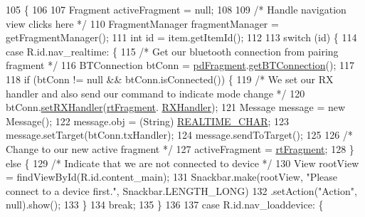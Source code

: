 \begin{DoxyCode}
105                                                            \{
106 
107         Fragment activeFragment = null;
108 
109         \textcolor{comment}{/* Handle navigation view clicks here */}
110         FragmentManager fragmentManager = getFragmentManager();
111         \textcolor{keywordtype}{int} \textcolor{keywordtype}{id} = item.getItemId();
112 
113         \textcolor{keywordflow}{switch} (\textcolor{keywordtype}{id}) \{
114             \textcolor{keywordflow}{case} R.id.nav\_realtime: \{
115                 \textcolor{comment}{/* Get our bluetooth connection from pairing fragment */}
116                 BTConnection btConn = \hyperlink{class_android_app_1_1_main_activity_a6dea684256a0cd0f73f87546ec2b0de2}{pdFragment}.\hyperlink{class_android_app_1_1_pair_device_fragment_ae68bfed66a421a3020a257cbc034e42d}{getBTConnection}();
117 
118                 \textcolor{keywordflow}{if} (btConn != null && btConn.isConnected()) \{
119                     \textcolor{comment}{/* We set our RX handler and also send our command to indicate mode change */}
120                     btConn.\hyperlink{class_android_app_1_1_b_t_connection_a41022747db3c5a8bf0f4ddbc7bf32a3d}{setRXHandler}(\hyperlink{class_android_app_1_1_main_activity_ad0c2b20cf0204ef3b8ad00596870e9a1}{rtFragment}.
      \hyperlink{class_android_app_1_1_realtime_fragment_a6497ae268ff103aecc48a4bae15059d7}{RXHandler});
121                     Message message = \textcolor{keyword}{new} Message();
122                     message.obj = (String) \hyperlink{class_android_app_1_1_main_activity_a5b01be4fe68777c22779415e54432a79}{REALTIME\_CHAR};
123                     message.setTarget(btConn.txHandler);
124                     message.sendToTarget();
125 
126                     \textcolor{comment}{/* Change to our new active fragment */}
127                     activeFragment = \hyperlink{class_android_app_1_1_main_activity_ad0c2b20cf0204ef3b8ad00596870e9a1}{rtFragment};
128                 \} \textcolor{keywordflow}{else} \{
129                     \textcolor{comment}{/* Indicate that we are not connected to device */}
130                     View rootView = findViewById(R.id.content\_main);
131                     Snackbar.make(rootView, \textcolor{stringliteral}{"Please connect to a device first."}, Snackbar.LENGTH\_LONG)
132                             .setAction(\textcolor{stringliteral}{"Action"}, null).show();
133                 \}
134                 \textcolor{keywordflow}{break};
135             \}
136 
137             \textcolor{keywordflow}{case} R.id.nav\_loaddevice: \{

\end{DoxyCode}
